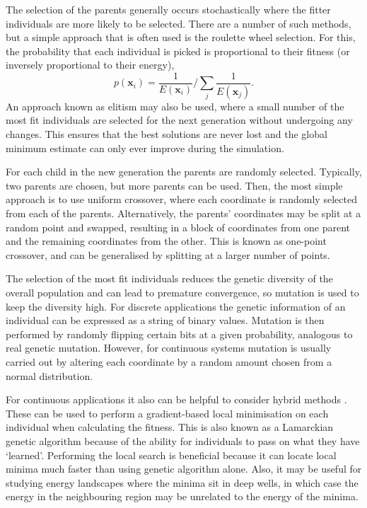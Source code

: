 The selection of the parents generally occurs stochastically where the fitter individuals are more likely to be selected.
There are a number of such methods, but a simple approach that is often used is the roulette wheel selection.
For this, the probability that each individual is picked is proportional to their fitness (or inversely proportional to their energy),
\begin{equation}
  p(\bm{x}_i) = \frac{1}{E(\bm{x}_i)} \bigg/ \sum_j \frac{1}{E(\bm{x}_j)}.
\end{equation}
An approach known as elitism may also be used, where a small number of the most fit individuals are selected for the next generation without undergoing any changes.
This ensures that the best solutions are never lost and the global minimum estimate can only ever improve during the simulation.

For each child in the new generation the parents are randomly selected.
Typically, two parents are chosen, but more parents can be used.
Then, the most simple approach is to use uniform crossover, where each coordinate is randomly selected from each of the parents.
Alternatively, the parents' coordinates may be split at a random point and swapped, resulting in a block of coordinates from one parent and the remaining coordinates from the other.
This is known as one-point crossover, and can be generalised by splitting at a larger number of points.

The selection of the most fit individuals reduces the genetic diversity of the overall population and can lead to premature convergence, so mutation is used to keep the diversity high.
For discrete applications the genetic information of an individual can be expressed as a string of binary values.
Mutation is then performed by randomly flipping certain bits at a given probability, analogous to real genetic mutation.
However, for continuous systems mutation is usually carried out by altering each coordinate by a random amount chosen from a normal distribution.

For continuous applications it also can be helpful to consider hybrid methods \cite{El-Mihoub2006}.
These can be used to perform a gradient-based local minimisation on each individual when calculating the fitness.
This is also known as a Lamarckian genetic algorithm because of the ability for individuals to pass on what they have `learned'.
Performing the local search is beneficial because it can locate local minima much faster than using genetic algorithm alone.
Also, it may be useful for studying energy landscapes where the minima sit in deep wells, in which case the energy in the neighbouring region may be unrelated to the energy of the minima.

